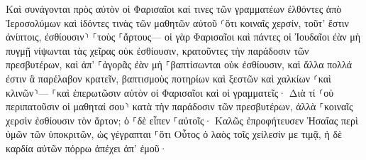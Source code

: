\documentclass{openreader}
\begin{document}
Καὶ συνάγονται πρὸς αὐτὸν οἱ Φαρισαῖοι καί τινες τῶν γραμματέων ἐλθόντες ἀπὸ Ἱεροσολύμων 
καὶ ἰδόντες τινὰς τῶν μαθητῶν αὐτοῦ ⸂ὅτι κοιναῖς χερσίν, τοῦτ’ ἔστιν ἀνίπτοις, ἐσθίουσιν⸃ ⸀τοὺς ⸀ἄρτους— 
οἱ γὰρ Φαρισαῖοι καὶ πάντες οἱ Ἰουδαῖοι ἐὰν μὴ πυγμῇ νίψωνται τὰς χεῖρας οὐκ ἐσθίουσιν, κρατοῦντες τὴν παράδοσιν τῶν πρεσβυτέρων, 
καὶ ἀπ’ ⸀ἀγορᾶς ἐὰν μὴ ⸀βαπτίσωνται οὐκ ἐσθίουσιν, καὶ ἄλλα πολλά ἐστιν ἃ παρέλαβον κρατεῖν, βαπτισμοὺς ποτηρίων καὶ ξεστῶν καὶ χαλκίων ⸂καὶ κλινῶν⸃— 
⸀καὶ ἐπερωτῶσιν αὐτὸν οἱ Φαρισαῖοι καὶ οἱ γραμματεῖς· Διὰ τί ⸂οὐ περιπατοῦσιν οἱ μαθηταί σου⸃ κατὰ τὴν παράδοσιν τῶν πρεσβυτέρων, ἀλλὰ ⸀κοιναῖς χερσὶν ἐσθίουσιν τὸν ἄρτον; 
ὁ ⸀δὲ εἶπεν ⸀αὐτοῖς· Καλῶς ἐπροφήτευσεν Ἠσαΐας περὶ ὑμῶν τῶν ὑποκριτῶν, ὡς γέγραπται ⸀ὅτι Οὗτος ὁ λαὸς τοῖς χείλεσίν με τιμᾷ, ἡ δὲ καρδία αὐτῶν πόρρω ἀπέχει ἀπ’ ἐμοῦ· 
\end{document}
